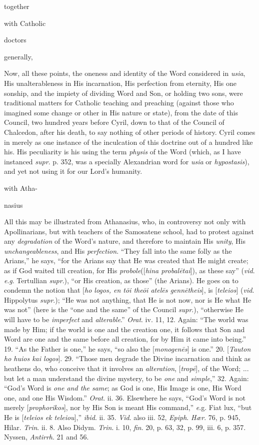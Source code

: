 together

with Catholic

doctors

generally,

Now, all these points, the oneness and
identity of the Word considered in \emph{usia}, His
unalterableness in His incarnation, His perfection from
eternity, His one sonship, and the impiety of dividing Word
and Son, or holding two sons, were traditional matters for
Catholic teaching and preaching (against those who imagined
some change or other in His nature or state), from the date of
this Council, two hundred years before Cyril, down to that of
the Council of Chalcedon, after his death, to say nothing of
other periods of history. Cyril comes in merely as one
instance of the inculcation of this doctrine out of a hundred
like his. His peculiarity is his using the term \emph{physis}
of the Word (which, as I have instanced \emph{supr}. p. 352,
was a specially Alexandrian word for \emph{usia} or \emph{hypostasis}),
and yet not using it for our Lord's humanity.

with Atha-

nasius

All this may be
illustrated from Athanasius, who, in controversy not only with
Apollinarians, but with teachers of the Samosatene school, had
to protest against any \emph{degradation} of the Word's
nature, and therefore to maintain His \emph{unity}, His \emph{unchangeableness},
and His \emph{perfection}. ``They fall into the same folly as
the Arians,'' he says, ``for the Arians say that He
was created that He might create; as if God waited till
creation, for His \emph{probole}([\emph{hina probal\={e}tai}]),
as these say'' (\emph{vid}. \emph{e}.\emph{g}. Tertullian \emph{supr}.),
``or His creation, as those'' (the Arians). He goes on to
condemn the notion that [\emph{ho logos, en t\={o}i the\={o}i
atel\={e}s genn\={e}theis}], is [\emph{teleios}] (\emph{vid}.
Hippolytus \emph{supr}.); ``He was not anything, that He is
not now, nor is He what He was not'' (here is the ``one and
the same'' of the Council \emph{supr}.), ``otherwise He will
have to be \emph{imperfect} and \emph{alterable}.'' \emph{Orat}.
iv. 11, 12. Again: ``The world was made by Him; if the world
is one and the creation one, it follows that Son and Word are
one and the same before all creation, for by Him it came into
being.'' 19. ``As the Father is one,'' he says, ``so also
the [\emph{monogen\={e}s}] is one.'' 20. [\emph{Tauton ho
huios kai logos}]. 29. ``Those men degrade the Divine
incarnation and think as heathens do, who conceive that it
involves an \emph{alteration}, [\emph{trop\={e}}], of the
Word; ... but let a man understand the divine mystery, to be \emph{one}
and \emph{simple},'' 32. Again: ``God's Word is \emph{one and
the same}; as God is one, His Image is one, His Word one,
and one His Wisdom.'' \emph{Orat}. ii. 36. Elsewhere he says, ``God's Word is not merely [\emph{prophorikos}], nor by His
Son is meant His command,'' \emph{e}.g. Fiat lux, ``but He
is [\emph{teleios ek teleiou}],'' \emph{ibid}. ii. 35. \emph{Vid}.
also iii. 52, \emph{Epiph}. \emph{Hær}. 76, p. 945, Hilar. \emph{Trin}.
ii. 8. Also Didym. \emph{Trin}. i. 10, \emph{fin}. 20, p. 63,
32, p. 99, iii. 6, p. 357. Nyssen, \emph{Antirrh}. 21 and 56.

